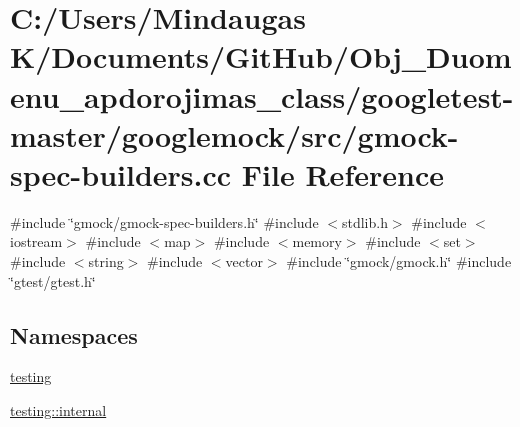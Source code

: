 \hypertarget{googletest-master_2googlemock_2src_2gmock-spec-builders_8cc}{}\section{C\+:/\+Users/\+Mindaugas K/\+Documents/\+Git\+Hub/\+Obj\+\_\+\+Duomenu\+\_\+apdorojimas\+\_\+class/googletest-\/master/googlemock/src/gmock-\/spec-\/builders.cc File Reference}
\label{googletest-master_2googlemock_2src_2gmock-spec-builders_8cc}
{\ttfamily \#include \char`\"{}gmock/gmock-\/spec-\/builders.\+h\char`\"{}}\newline
{\ttfamily \#include $<$stdlib.\+h$>$}\newline
{\ttfamily \#include $<$iostream$>$}\newline
{\ttfamily \#include $<$map$>$}\newline
{\ttfamily \#include $<$memory$>$}\newline
{\ttfamily \#include $<$set$>$}\newline
{\ttfamily \#include $<$string$>$}\newline
{\ttfamily \#include $<$vector$>$}\newline
{\ttfamily \#include \char`\"{}gmock/gmock.\+h\char`\"{}}\newline
{\ttfamily \#include \char`\"{}gtest/gtest.\+h\char`\"{}}\newline
\subsection*{Namespaces}
\begin{DoxyCompactItemize}
\item 
 \mbox{\hyperlink{namespacetesting}{testing}}
\item 
 \mbox{\hyperlink{namespacetesting_1_1internal}{testing\+::internal}}
\end{DoxyCompactItemize}
